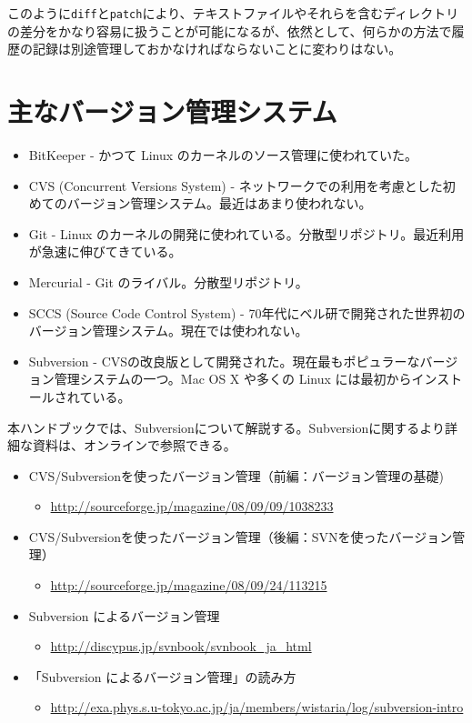 \documentclass[a4j]{jsbook}
\begin{document}
このように{\tt diff}と{\tt patch}により、テキストファイルやそれらを含むディレクトリの差分をかなり容易に扱うことが可能になるが、依然として、何らかの方法で履歴の記録は別途管理しておかなければならないことに変わりはない。

\section{主なバージョン管理システム}

\begin{itemize}
\item BitKeeper - かつて Linux のカーネルのソース管理に使われていた。
\item CVS (Concurrent Versions System) - ネットワークでの利用を考慮とした初めてのバージョン管理システム。最近はあまり使われない。
\item Git - Linux のカーネルの開発に使われている。分散型リポジトリ。最近利用が急速に伸びてきている。
\item Mercurial - Git のライバル。分散型リポジトリ。
\item SCCS (Source Code Control System) - 70年代にベル研で開発された世界初のバージョン管理システム。現在では使われない。
\item Subversion - CVSの改良版として開発された。現在最もポピュラーなバージョン管理システムの一つ。Mac OS X や多くの Linux には最初からインストールされている。
\end{itemize}
本ハンドブックでは、Subversionについて解説する。Subversionに関するより詳細な資料は、オンラインで参照できる。
\begin{itemize}
\item CVS/Subversionを使ったバージョン管理（前編：バージョン管理の基礎)
  \begin{itemize}
  \item \url{http://sourceforge.jp/magazine/08/09/09/1038233}
  \end{itemize}
\item CVS/Subversionを使ったバージョン管理（後編：SVNを使ったバージョン管理）
  \begin{itemize}
  \item \url{http://sourceforge.jp/magazine/08/09/24/113215}
  \end{itemize}
\item Subversion によるバージョン管理
  \begin{itemize}
  \item \url{http://discypus.jp/svnbook/svnbook_ja_html}
  \end{itemize}
\item 「Subversion によるバージョン管理」の読み方
  \begin{itemize}
  \item \url{http://exa.phys.s.u-tokyo.ac.jp/ja/members/wistaria/log/subversion-intro}
  \end{itemize}
\end{itemize}
\end{document}
